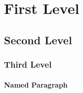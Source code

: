 \documentclass{article}
\begin{document}
\section{First Level}
\lipsum[1]
\subsection{Second Level}
\lipsum[2]
\subsubsection{Third Level}
\lipsum[3]
\paragraph{Named Paragraph}
\lipsum[4]
\end{document}
